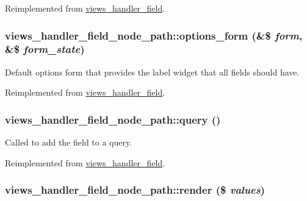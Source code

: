 Reimplemented from \hyperlink{classviews__handler__field_64c69a8a3697603f8283405071c25b76}{views\_\-handler\_\-field}.\hypertarget{classviews__handler__field__node__path_f0eb803f6004582da8a3b4aa9e81cedf}{
\subsubsection[{options\_\-form}]{\setlength{\rightskip}{0pt plus 5cm}views\_\-handler\_\-field\_\-node\_\-path::options\_\-form (\&\$ {\em form}, \/  \&\$ {\em form\_\-state})}}
\label{classviews__handler__field__node__path_f0eb803f6004582da8a3b4aa9e81cedf}


Default options form that provides the label widget that all fields should have. 

Reimplemented from \hyperlink{classviews__handler__field_0435d161922b7b4b84f02a2e79bb947a}{views\_\-handler\_\-field}.\hypertarget{classviews__handler__field__node__path_59474fa6e78296b5f0c2aca6a951907e}{
\subsubsection[{query}]{\setlength{\rightskip}{0pt plus 5cm}views\_\-handler\_\-field\_\-node\_\-path::query ()}}
\label{classviews__handler__field__node__path_59474fa6e78296b5f0c2aca6a951907e}


Called to add the field to a query. 

Reimplemented from \hyperlink{classviews__handler__field_4f661f91bcbe80d4a00c30a31456c502}{views\_\-handler\_\-field}.\hypertarget{classviews__handler__field__node__path_94067b369f0f373515cae33ad940ae2f}{
\subsubsection[{render}]{\setlength{\rightskip}{0pt plus 5cm}views\_\-handler\_\-field\_\-node\_\-path::render (\$ {\em values})}}
\label{classviews__handler__field__node__path_94067b369f0f373515cae33ad940ae2f}


